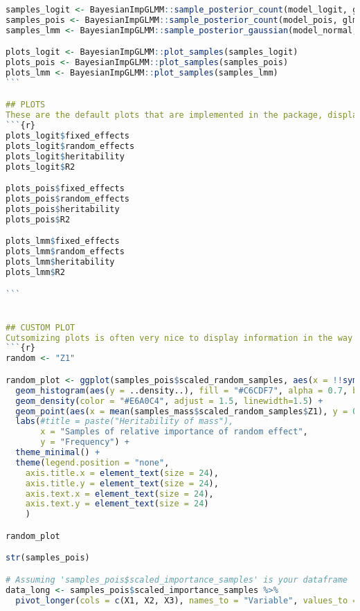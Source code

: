 \begin{lstlisting}[language=R, caption=Usage of the BayesianImpGLMM package with plots and examples.]
samples_logit <- BayesianImpGLMM::sample_posterior_count(model_logit, glmm_logit, datasets$binomial_logit, n_samp=5000, additive_param = "Z1")
samples_pois <- BayesianImpGLMM::sample_posterior_count(model_pois, glmm_pois, datasets$poisson, n_samp=5000, additive_param = "Z1")
samples_lmm <- BayesianImpGLMM::sample_posterior_gaussian(model_normal, lmm, datasets$normal, n_samp=5000, additive_param = "Z1")

plots_logit <- BayesianImpGLMM::plot_samples(samples_logit)
plots_pois <- BayesianImpGLMM::plot_samples(samples_pois)
plots_lmm <- BayesianImpGLMM::plot_samples(samples_lmm)
```

## PLOTS
These are the default plots that are implemented in the package, displaying the importance of all effects and $R^2$ metrics.
```{r}
plots_logit$fixed_effects
plots_logit$random_effects
plots_logit$heritability
plots_logit$R2

plots_pois$fixed_effects
plots_pois$random_effects
plots_pois$heritability
plots_pois$R2

plots_lmm$fixed_effects
plots_lmm$random_effects
plots_lmm$heritability
plots_lmm$R2

```


## CUSTOM PLOT
Cutsomizing plots is often very nice to display information in the way you want it. Therefore, we show how one can customize the plots using ggplot2 based on the samples drawn.
```{r}
random <- "Z1"

random_plot <- ggplot(samples_pois$scaled_random_samples, aes(x = !!sym(random))) +
  geom_histogram(aes(y = ..density..), fill = "#C6CDF7", alpha = 0.7, bins = 40, color = "black") +
  geom_density(color = "#E6A0C4", adjust = 1.5, linewidth=1.5) +
  geom_point(aes(x = mean(samples_mass$scaled_random_samples$Z1), y = 0), color = "#E6A0C4", size = 4) +
  labs(#title = paste("Heritability of mass"),
       x = "Samples of relative importance of random effect",
       y = "Frequency") +
  theme_minimal() +
  theme(legend.position = "none",
    axis.title.x = element_text(size = 24),
    axis.title.y = element_text(size = 24),
    axis.text.x = element_text(size = 24),
    axis.text.y = element_text(size = 24)
    ) 

random_plot

str(samples_pois)

# Assuming 'samples_pois$scaled_importance_samples' is your dataframe
data_long <- samples_pois$scaled_importance_samples %>%
  pivot_longer(cols = c(X1, X2, X3), names_to = "Variable", values_to = "Value")


\end{lstlisting}
